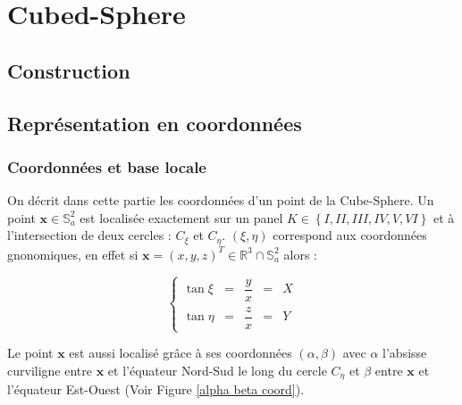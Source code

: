 \chapter{Cubed-Sphere}

\section{Construction}

\section{Représentation en coordonnées}

\subsection{Coordonnées et base locale}

On décrit dans cette partie les coordonnées d'un point de la Cube-Sphere. Un point $\mathbf{x} \in \mathbb{S}_a^2$ est localisée exactement sur un panel $K \in \left\lbrace I, II, III, IV, V, VI \right\rbrace$ et à l'intersection de deux cercles : $C_{\xi}$ et $C_{\eta}$. $(\xi,\eta)$ correspond aux coordonnées gnonomiques, en effet si $\mathbf{x} = (x,y,z)^T \in \mathbb{R}^3 \cap \mathbb{S}_a^2$ alors :

\begin{equation}
\left\lbrace
\begin{array}{rcccl}
\tan \xi & = & \dfrac{y}{x} & = & X\\
\tan \eta & = & \dfrac{z}{x}& = & Y
\end{array}
\right.
\end{equation}

Le point $\mathbf{x}$ est aussi localisé grâce à ses coordonnées $(\alpha, \beta)$ avec $\alpha$ l'absisse curviligne entre $\mathbf{x}$ et l'équateur Nord-Sud le long du cercle $C_{\eta}$ et $\beta$ entre $\mathbf{x}$ et l'équateur Est-Ouest (Voir Figure \ref{alpha beta coord}).


